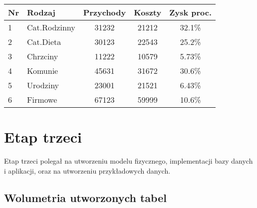 \documentclass[12pt]{article}
\begin{document}
\begin{center}
    \begin{tabular}{l|l|c|c|c}
    \textbf{Nr} & \textbf{Rodzaj} & \textbf{Przychody} & \textbf{Koszty} & \textbf{Zysk proc.} \\
    \hline
    1 & Cat.Rodzinny & 31232 & 21212 & 32.1\% \\
    2 & Cat.Dieta    & 30123 & 22543 & 25.2\% \\
    3 & Chrzciny     & 11222 & 10579 & 5.73\% \\
    4 & Komunie      & 45631 & 31672 & 30.6\% \\
    5 & Urodziny     & 23001 & 21521 & 6.43\% \\
    6 & Firmowe      & 67123 & 59999 & 10.6\% \\
    \end{tabular}
\end{center}

\pagebreak %

\section{Etap trzeci}
Etap trzeci polegał na utworzeniu modelu fizycznego, implementacji bazy danych i aplikacji, oraz na utworzeniu przykładowych danych.

\subsection{Wolumetria utworzonych tabel}
\end{document}
